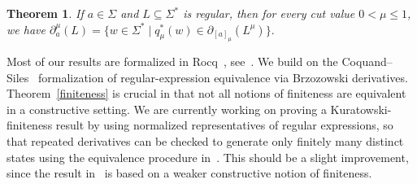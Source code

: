 \documentclass{easychair}
\newtheorem{theorem}{Theorem}
\begin{document}
\begin{theorem}\label{main} If $a\in\Sigma$ and $L\subseteq\Sigma^\ast$ is regular, then for every cut value $0<\mu\le1$, we have \mbox{$
\partial_a^\mu(L)
=
\{w\in\Sigma^\ast\mid
q_\mu^\ast(w)\in
\partial_{[a]_\mu}(L^\mu)\}.
$}
\end{theorem}


Most of our results are formalized in Rocq~\cite{Rocq}, see~\cite{OurRocqRepo}. We build on the Coquand--Siles~\cite{CoquandRegexEquality,RocqRegexpBrzozowski} formalization of
regular-expression equivalence via Brzozowski derivatives. Theorem~\ref{finiteness} is crucial in that not all notions of finiteness are equivalent in a constructive setting. We are currently working on proving a Kuratowski-finiteness result by using normalized representatives of regular
expressions, so that repeated derivatives can be checked to generate only finitely many distinct
states using the equivalence procedure in~\cite{CoquandRegexEquality}. This should be a slight improvement, since the result in~\cite{CoquandRegexEquality} is based on a weaker constructive notion of finiteness.
\end{document}
